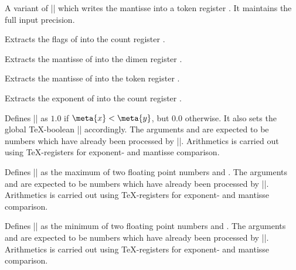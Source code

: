 \begin{command}{}
	A variant of |\pgfmathfloattoregisters| which writes the mantisse into a token register . It maintains the full input precision.
\end{command}

\begin{command}{}
	Extracts the flags of  into the count register .
\end{command}

\begin{command}{}
	Extracts the mantisse of  into the dimen register .
\end{command}
\begin{command}{}
	Extracts the mantisse of  into the token register .
\end{command}
\begin{command}{}
	Extracts the exponent of  into the count register .
\end{command}

\begin{command}{}
	Defines |\pgfmathresult| as $1.0$ if $\meta{x} < \meta{y}$, but $0.0$ otherwise. It also sets the global \TeX-boolean |\pgfmathfloatcomparison| accordingly. The arguments  and  are expected to be numbers which have already been processed by |\pgfmathfloatparsenumber|. Arithmetics is carried out using \TeX-registers for exponent- and mantisse comparison.
\end{command}

\begin{command}{}
	Defines |\pgfmathresult| as the maximum of two floating point numbers  and . The arguments  and  are expected to be numbers which have already been processed by |\pgfmathfloatparsenumber|. Arithmetics is carried out using \TeX-registers for exponent- and mantisse comparison.
\end{command}

\begin{command}{}
	Defines |\pgfmathresult| as the minimum of two floating point numbers  and . The arguments  and  are expected to be numbers which have already been processed by |\pgfmathfloatparsenumber|. Arithmetics is carried out using \TeX-registers for exponent- and mantisse comparison.
\end{command}


